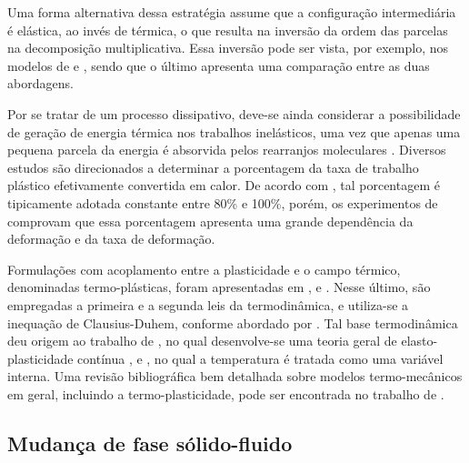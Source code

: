 \documentclass[Tese.tex]{subfiles}
\begin{document}
Uma forma alternativa dessa estratégia assume que a configuração intermediária é elástica, ao invés de térmica, o que resulta na inversão da ordem das parcelas na decomposição multiplicativa. Essa inversão pode ser vista, por exemplo, nos modelos de  e , sendo que o último apresenta uma comparação entre as duas abordagens.

Por se tratar de um processo dissipativo, deve-se ainda considerar a possibilidade de geração de energia térmica nos trabalhos inelásticos, uma vez que apenas uma pequena parcela da energia é absorvida pelos rearranjos moleculares \cite{KAMLAH1997893}. Diversos estudos são direcionados a determinar a porcentagem da taxa de trabalho plástico efetivamente convertida em calor. De acordo com , tal porcentagem é tipicamente adotada constante entre 80\% e 100\%, porém, os experimentos de  comprovam que essa porcentagem apresenta uma grande dependência da deformação e da taxa de deformação. 

Formulações com acoplamento entre a plasticidade e o campo térmico, denominadas termo-plásticas, foram apresentadas em ,  e . Nesse último, são empregadas a primeira e a segunda leis da termodinâmica, e utiliza-se a inequação de Clausius-Duhem, conforme abordado por . Tal base termodinâmica deu origem ao trabalho de , no qual desenvolve-se uma teoria geral de elasto-plasticidade contínua \cite{LEE2001187}, e , no qual a temperatura é tratada como uma variável interna. Uma revisão bibliográfica bem detalhada sobre modelos termo-mecânicos em geral, incluindo a termo-plasticidade, pode ser encontrada no trabalho de .


\subsection{Mudança de fase sólido-fluido}
\end{document}
